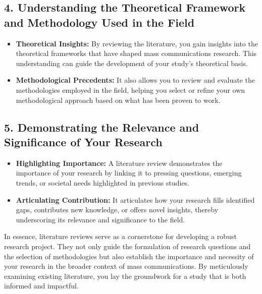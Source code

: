 \documentclass[
]{book}
\providecommand{\tightlist}{%
  \setlength{\itemsep}{0pt}\setlength{\parskip}{0pt}}
\begin{document}
\hypertarget{understanding-the-theoretical-framework-and-methodology-used-in-the-field}{%
\subsection*{4. Understanding the Theoretical Framework and Methodology Used in the Field}\label{understanding-the-theoretical-framework-and-methodology-used-in-the-field}}

\begin{itemize}
\tightlist
\item
  \textbf{Theoretical Insights:} By reviewing the literature, you gain insights into the theoretical frameworks that have shaped mass communications research. This understanding can guide the development of your study's theoretical basis.
\item
  \textbf{Methodological Precedents:} It also allows you to review and evaluate the methodologies employed in the field, helping you select or refine your own methodological approach based on what has been proven to work.
\end{itemize}

\hypertarget{demonstrating-the-relevance-and-significance-of-your-research}{%
\subsection*{5. Demonstrating the Relevance and Significance of Your Research}\label{demonstrating-the-relevance-and-significance-of-your-research}}

\begin{itemize}
\tightlist
\item
  \textbf{Highlighting Importance:} A literature review demonstrates the importance of your research by linking it to pressing questions, emerging trends, or societal needs highlighted in previous studies.
\item
  \textbf{Articulating Contribution:} It articulates how your research fills identified gaps, contributes new knowledge, or offers novel insights, thereby underscoring its relevance and significance to the field.
\end{itemize}

In essence, literature reviews serve as a cornerstone for developing a robust research project. They not only guide the formulation of research questions and the selection of methodologies but also establish the importance and necessity of your research in the broader context of mass communications. By meticulously examining existing literature, you lay the groundwork for a study that is both informed and impactful.
\end{document}
